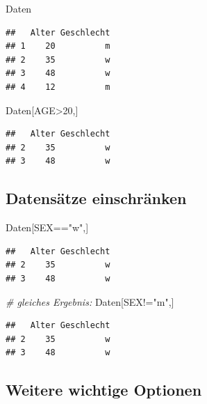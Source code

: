 \documentclass[]{article}
\newenvironment{Shaded}{\begin{snugshade}}{\end{snugshade}}
\newcommand{\DecValTok}[1]{\textcolor[rgb]{0.00,0.00,0.81}{{#1}}}
\newcommand{\StringTok}[1]{\textcolor[rgb]{0.31,0.60,0.02}{{#1}}}
\newcommand{\CommentTok}[1]{\textcolor[rgb]{0.56,0.35,0.01}{\textit{{#1}}}}
\newcommand{\NormalTok}[1]{{#1}}
\begin{document}
\begin{Shaded}
\begin{Highlighting}[]
\NormalTok{Daten}
\end{Highlighting}
\end{Shaded}

\begin{verbatim}
##   Alter Geschlecht
## 1    20          m
## 2    35          w
## 3    48          w
## 4    12          m
\end{verbatim}

\begin{Shaded}
\begin{Highlighting}[]
\NormalTok{Daten[AGE>}\DecValTok{20}\NormalTok{,]}
\end{Highlighting}
\end{Shaded}

\begin{verbatim}
##   Alter Geschlecht
## 2    35          w
## 3    48          w
\end{verbatim}

\subsection{Datensätze einschränken}\label{datensatze-einschranken}

\begin{Shaded}
\begin{Highlighting}[]
\NormalTok{Daten[SEX==}\StringTok{"w"}\NormalTok{,]}
\end{Highlighting}
\end{Shaded}

\begin{verbatim}
##   Alter Geschlecht
## 2    35          w
## 3    48          w
\end{verbatim}

\begin{Shaded}
\begin{Highlighting}[]
\CommentTok{# gleiches Ergebnis:}
\NormalTok{Daten[SEX!=}\StringTok{"m"}\NormalTok{,]}
\end{Highlighting}
\end{Shaded}

\begin{verbatim}
##   Alter Geschlecht
## 2    35          w
## 3    48          w
\end{verbatim}

\subsection{Weitere wichtige Optionen}\label{weitere-wichtige-optionen}
\end{document}
